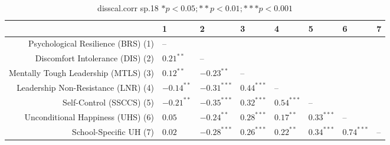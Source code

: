 \begin{table}[ht]
\centering
\begin{tabular}{rlllllll}
  \hline
 & 1 & 2 & 3 & 4 & 5 & 6 & 7 \\ 
  \hline
Psychological Resilience (BRS) (1) & -- &  &  &  &  &  &  \\ 
  Discomfort Intolerance (DIS) (2) & $0.21^{**}$ & -- &  &  &  &  &  \\ 
  Mentally Tough Leadership (MTLS) (3) & $0.12^{**}$ & $-0.23^{**}$ & -- &  &  &  &  \\ 
  Leadership Non-Resistance (LNR) (4) & $-0.14^{**}$ & $-0.31^{***}$ & $0.44^{***}$ & -- &  &  &  \\ 
  Self-Control (SSCCS) (5) & $-0.21^{**}$ & $-0.35^{***}$ & $0.32^{***}$ & $0.54^{***}$ & -- &  &  \\ 
  Unconditional Happiness (UHS) (6) & $0.05$ & $-0.24^{**}$ & $0.28^{***}$ & $0.17^{**}$ & $0.33^{***}$ & -- &  \\ 
  School-Specific UH (7) & $0.02$ & $-0.28^{***}$ & $0.26^{***}$ & $0.22^{**}$ & $0.34^{***}$ & $0.74^{***}$ & -- \\ 
   \hline
\end{tabular}
\caption{disscal.corr sp.18 $* p < 0.05; ** p < 0.01; *** p < 0.001$} 
\label{freq_corr.disscal.corr.sp.18}
\end{table}
